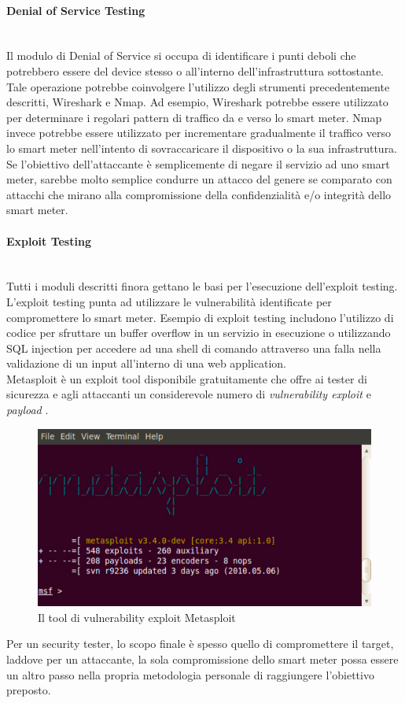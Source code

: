 \paragraph{Denial of Service Testing}\mbox{}\\
Il modulo di Denial of Service si occupa di identificare i punti deboli che potrebbero essere del device stesso o all'interno dell'infrastruttura sottostante. Tale operazione potrebbe coinvolgere l'utilizzo degli strumenti precedentemente descritti, Wireshark e Nmap. Ad esempio, Wireshark potrebbe essere utilizzato per determinare i regolari pattern di traffico da e verso lo smart meter. Nmap invece potrebbe essere utilizzato per incrementare gradualmente il traffico verso lo smart meter nell'intento di sovraccaricare il dispositivo o la sua infrastruttura.\\
Se l'obiettivo dell'attaccante è semplicemente di negare il servizio ad uno smart meter, sarebbe molto semplice condurre un attacco del genere se comparato con attacchi che mirano alla compromissione della confidenzialità e/o integrità dello smart meter.

\paragraph{Exploit Testing}\mbox{}\\
Tutti i moduli descritti finora gettano le basi per l'esecuzione dell'exploit testing. L'exploit testing punta ad utilizzare le vulnerabilità identificate per compromettere lo smart meter. Esempio di exploit testing includono l'utilizzo di codice per sfruttare un buffer overflow in un servizio in esecuzione o utilizzando SQL injection per accedere ad una shell di comando attraverso una falla nella validazione di un input all'interno di una web application.\\
Metasploit è un exploit tool disponibile gratuitamente che offre ai tester di sicurezza e agli attaccanti un considerevole numero di \emph{vulnerability exploit} e \emph{payload} \cite{metasploit}.
\begin{figure}[hbtp]
	\centering
	\includegraphics[scale=.3]{imgs/attack/metasploit.png}
	\caption{Il tool di vulnerability exploit Metasploit}
	\label{metasploit_img}
\end{figure}
Per un security tester, lo scopo finale è spesso quello di compromettere il target, laddove per un attaccante, la sola compromissione dello smart meter possa essere un altro passo nella propria metodologia personale di raggiungere l'obiettivo preposto.


